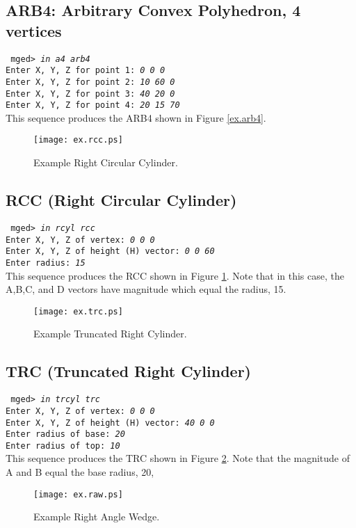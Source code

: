 \subsection{ARB4: Arbitrary Convex Polyhedron, 4 vertices}

{\tt
mged> {\em in a4 arb4} \\
Enter X, Y, Z for point 1: {\em 0 0 0} \\
Enter X, Y, Z for point 2: {\em 10 60 0} \\
Enter X, Y, Z for point 3: {\em 40 20 0} \\
Enter X, Y, Z for point 4: {\em 20 15 70} \\
}
This sequence produces the ARB4 shown in Figure \ref{ex.arb4}.
\begin{figure}
\centering \texttt{[image: ex.rcc.ps]}
\caption{Example Right Circular Cylinder.}
\label{ex.rcc}
\end{figure}

\subsection{RCC (Right Circular Cylinder)}

{\tt
mged> {\em in rcyl rcc} \\
Enter X, Y, Z of vertex: {\em 0 0 0} \\
Enter X, Y, Z of height (H) vector: {\em 0 0 60} \\
Enter radius: {\em 15} \\
}
This sequence produces the RCC shown in Figure \ref{ex.rcc}.
Note that in this case, the A,B,C, and D vectors have magnitude
which equal the radius, 15.
\begin{figure}
\centering \texttt{[image: ex.trc.ps]}
\caption{Example Truncated Right Cylinder.}
\label{ex.trc}
\end{figure}

\subsection{TRC (Truncated Right Cylinder)}

{\tt
mged> {\em in trcyl trc} \\
Enter X, Y, Z of vertex: {\em 0 0 0} \\
Enter X, Y, Z of height (H) vector: {\em 40 0 0} \\
Enter radius of base: {\em 20} \\
Enter radius of top: {\em 10} \\
}
This sequence produces the TRC shown in Figure \ref{ex.trc}.
Note that the magnitude of A and B equal the base radius, 20,
\begin{figure}
\centering \texttt{[image: ex.raw.ps]}
\caption{Example Right Angle Wedge.}
\label{ex.raw}
\end{figure}

